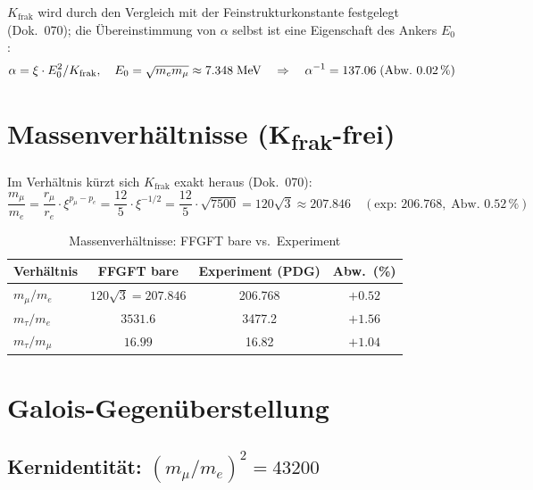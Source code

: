 $K_\text{frak}$ wird durch den Vergleich mit der Feinstrukturkonstante festgelegt (Dok.~070);
die Übereinstimmung von $\alpha$ selbst ist eine Eigenschaft des Ankers $E_0$:
\begin{equation}
  \alpha = \xi \cdot E_0^2 / K_\text{frak},
  \quad E_0 = \sqrt{m_e m_\mu} \approx 7.348\;\text{MeV}
  \quad\Rightarrow\quad \alpha^{-1} = 137.06\;\text{(Abw.\ 0.02\,\%)}
\end{equation}

\section{Massenverhältnisse (K\textsubscript{frak}-frei)}

Im Verhältnis kürzt sich $K_\text{frak}$ exakt heraus (Dok.~070):
\begin{equation}
  \frac{m_\mu}{m_e} = \frac{r_\mu}{r_e} \cdot \xi^{p_\mu - p_e}
  = \frac{12}{5} \cdot \xi^{-1/2}
  = \frac{12}{5} \cdot \sqrt{7500}
  = 120\sqrt{3}
  \approx 207.846 \quad (\text{exp: }206.768,\;\text{Abw.\ }0.52\,\%)
\end{equation}

\begin{table}[H]
\centering
\caption{Massenverhältnisse: FFGFT bare vs.\ Experiment}
\begin{tabular}{lccc}
\toprule
Verhältnis & FFGFT bare & Experiment (PDG) & Abw.\ (\%) \\
\midrule
$m_\mu/m_e$   & $120\sqrt{3} = 207.846$  & 206.768 & $+0.52$ \\
$m_\tau/m_e$  & $3531.6$                 & 3477.2  & $+1.56$ \\
$m_\tau/m_\mu$& $16.99$                  & 16.82   & $+1.04$ \\
\bottomrule
\end{tabular}
\end{table}

\section{Galois-Gegenüberstellung}

\subsection{Kernidentität: $(m_\mu/m_e)^2 = 43200$}

